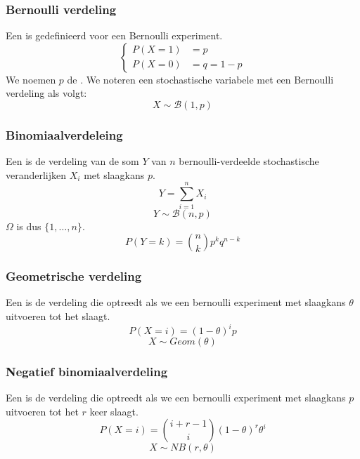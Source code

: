 \documentclass[main.tex]{subfiles}
\begin{document}
\subsubsection{Bernoulli verdeling}
\label{sec:bernoulli-verdeling}

\begin{de}
  Een  is gedefinieerd voor een Bernoulli experiment.
  \[
  \begin{cases}
    P(X=1) &= p\\
    P(X=0) &= q = 1-p
  \end{cases}
  \]
  We noemen $p$ de .
  We noteren een stochastische variabele met een Bernoulli verdeling als volgt:
  \[ X \sim \mathcal{B}(1,p) \]
\end{de}


\subsubsection{Binomiaalverdeleing}
\label{sec:binomiaalverdeleing}

\begin{de}
  Een  is de verdeling van de som $Y$ van $n$ bernoulli-verdeelde stochastische veranderlijken $X_{i}$ met slaagkans $p$.
  \[ Y = \sum_{i=1}^{n}X_{i}\]
  \[ Y \sim \mathcal{B}(n,p) \]
  $\Omega$ is dus $\{1,\dotsc,n\}$.
  \[ P(Y=k) = \binom{n}{k}p^{k}q^{n-k} \]
\end{de}

\subsubsection{Geometrische verdeling}
\label{sec:geom-verd}

\begin{de}
  Een  is de verdeling die optreedt als we een bernoulli experiment met slaagkans $\theta$ uitvoeren tot het slaagt.
  \[ P(X=i) = (1-\theta)^{i}p \]
  \[ X \sim Geom(\theta) \]
\end{de}


\subsubsection{Negatief binomiaalverdeling}
\label{sec:negat-binom}

\begin{de}
  Een  is de verdeling die optreedt als we een bernoulli experiment met slaagkans $p$ uitvoeren tot het $r$ keer slaagt.
  \[ P(X=i) = \binom{i+r-1}{i}(1-\theta)^{r}\theta^{i} \]
  \[ X \sim NB(r,\theta) \]
\end{de}
\end{document}
